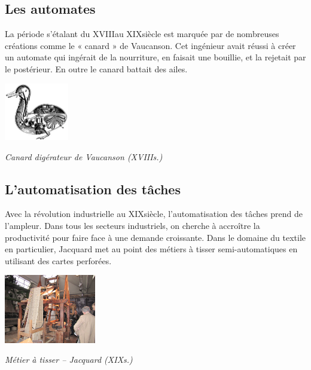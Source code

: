 \documentclass[10pt,fleqn]{article} %
\begin{document}
\subsection{Les automates}
\begin{minipage}[c]{0.7\textwidth}
La période s'étalant du XVIII\ieme au XIX\ieme siècle est marquée par de
nombreuses créations comme le « canard » de Vaucanson.
Cet ingénieur avait réussi à créer un automate qui ingérait de la nourriture, en
faisait une bouillie, et la rejetait par le postérieur. En outre le canard battait des ailes. 

\end{minipage}\hfill
\begin{minipage}[c]{0.2\textwidth}
 \begin{center}
 \includegraphics[height=2.5cm]{images/vaucanson}

\textit{Canard digérateur de Vaucanson (XVIII\ieme s.)}
 \end{center}
\end{minipage}

\subsection{L'automatisation des tâches}
\begin{minipage}[c]{0.7\textwidth}
Avec la révolution industrielle au XIX\ieme siècle, l'automatisation des tâches prend de l'ampleur. Dans tous les secteurs industriels, on cherche à accroître la productivité pour faire face à une demande croissante. Dans le domaine du textile en particulier, Jacquard met au point des métiers à tisser semi-automatiques en utilisant des cartes perforées.

\end{minipage}\hfill
\begin{minipage}[c]{0.25\textwidth}
 \begin{center}
 \includegraphics[height=3cm]{images/jacquard_p}

\textit{Métier à tisser -- Jacquard (XIX\ieme s.)}
 \end{center}
\end{minipage}
\end{document}
